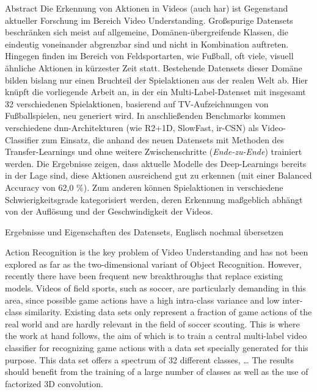 \newcommand{\primarymetric}{62,0 \%}

\begin{prefacesection}{Abstract}
    Die Erkennung von Aktionen in Videos (auch \gls{har}) ist Gegenstand aktueller Forschung im Bereich Video Understanding.
    Großspurige Datensets beschränken sich meist auf allgemeine, Domänen-übergreifende Klassen, die eindeutig voneinander abgrenzbar sind und nicht in Kombination auftreten.
    Hingegen finden im Bereich von Feldsportarten, wie Fußball, oft viele, visuell ähnliche Aktionen in kürzester Zeit statt.
    Bestehende Datensets dieser Domäne bilden bislang nur einen Bruchteil der Spielaktionen aus der realen Welt ab.
    Hier knüpft die vorliegende Arbeit an, in der ein Multi-Label-Datenset mit insgesamt 32 verschiedenen Spielaktionen, basierend auf TV-Aufzeichnungen von Fußballspielen, neu generiert wird.
    In anschließenden Benchmarks kommen verschiedene \gls{dnn}-Architekturen (wie R2+1D, SlowFast, ir-CSN) als Video-Classifier zum Einsatz, die anhand des neuen Datensets mit Methoden des Transfer-Learnings und ohne weitere Zwischenschritte (\emph{Ende-zu-Ende}) trainiert werden.
    Die Ergebnisse zeigen, dass aktuelle Modelle des Deep-Learnings bereits in der Lage sind, diese Aktionen ausreichend gut zu erkennen (mit einer Balanced Accuracy von \primarymetric).
    Zum anderen können Spielaktionen in verschiedene Schwierigkeitsgrade kategorisiert werden, deren Erkennung maßgeblich abhängt von der Auflösung und der Geschwindigkeit der Videos.

    \begin{tcolorbox}[title=Todo]
        Ergebnisse und Eigenschaften des Datensets, Englisch nochmal übersetzen
    \end{tcolorbox}


    Action Recognition is the key problem of Video Understanding and has not been explored as far as the two-dimensional variant of Object Recognition.
    However, recently there have been frequent new breakthroughs that replace existing models.
    Videos of field sports, such as soccer, are particularly demanding in this area, since possible game actions have a high intra-class variance and low inter-class similarity.
    Existing data sets only represent a fraction of game actions of the real world and are hardly relevant in the field of soccer scouting.
    This is where the work at hand follows, the aim of which is to train a central multi-label video classifier for recognizing game actions with a data set specially generated for this purpose.
    This data set offers a spectrum of 32 different classes, \dots
    The results should benefit from the training of a large number of classes as well as the use of factorized 3D convolution.

\end{prefacesection}